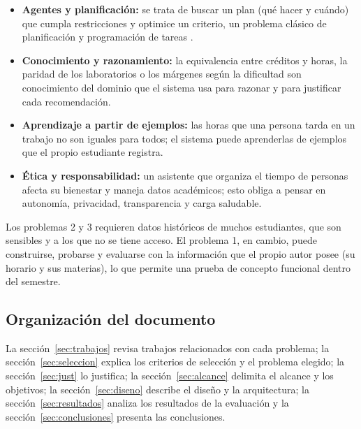 \begin{itemize}
    \item \textbf{Agentes y planificación:} se trata de buscar un plan (qué hacer y cuándo) que cumpla restricciones y optimice un criterio, un problema clásico de planificación y programación de tareas \parencite{Russell2021}.
    \item \textbf{Conocimiento y razonamiento:} la equivalencia entre créditos y horas, la paridad de los laboratorios o los márgenes según la dificultad son conocimiento del dominio que el sistema usa para razonar y para justificar cada recomendación.
    \item \textbf{Aprendizaje a partir de ejemplos:} las horas que una persona tarda en un trabajo no son iguales para todos; el sistema puede aprenderlas de ejemplos que el propio estudiante registra.
    \item \textbf{Ética y responsabilidad:} un asistente que organiza el tiempo de personas afecta su bienestar y maneja datos académicos; esto obliga a pensar en autonomía, privacidad, transparencia y carga saludable.
\end{itemize}

Los problemas 2 y 3 requieren datos históricos de muchos estudiantes, que son sensibles y a los que no se tiene acceso. El problema 1, en cambio, puede construirse, probarse y evaluarse con la información que el propio autor posee (su horario y sus materias), lo que permite una prueba de concepto funcional dentro del semestre.

\subsection{Organización del documento}

La sección~\ref{sec:trabajos} revisa trabajos relacionados con cada problema; la sección~\ref{sec:seleccion} explica los criterios de selección y el problema elegido; la sección~\ref{sec:just} lo justifica; la sección~\ref{sec:alcance} delimita el alcance y los objetivos; la sección~\ref{sec:diseno} describe el diseño y la arquitectura; la sección~\ref{sec:resultados} analiza los resultados de la evaluación y la sección~\ref{sec:conclusiones} presenta las conclusiones.
